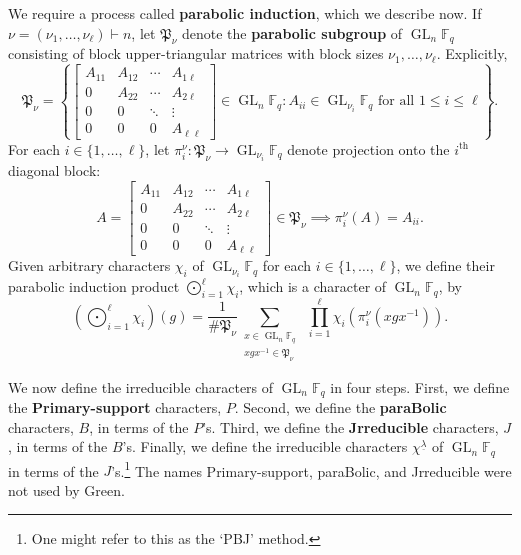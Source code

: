 \documentclass[Unicode,ALCO]{cedram}
\DeclareMathOperator{\GL}{GL}
\newcommand{\F}{\mathbb{F}}
\newcommand{\myemph}{\textbf}
\newcommand{\para}{\mathfrak{P}}
\newcommand{\ulambda}{{\underline{\lambda}}}
\begin{document}
We require a process called \myemph{parabolic induction}, which we describe now.
If $\nu = (\nu_1,\ldots,\nu_\ell) \vdash n$, let $\para_\nu$ denote the \myemph{parabolic subgroup} of $\GL_{n} \F_q$ consisting of block upper-triangular matrices with block sizes $\nu_1, \ldots, \nu_\ell$. Explicitly,
\begin{equation}
\label{para_def}
\para_\nu = \left \{
\begin{bmatrix}
A_{11} & A_{12} & \cdots & A_{1 \ell} \\
0 & A_{22} & \cdots & A_{2 \ell} \\
0 & 0 & \ddots & \vdots \\
0 & 0 & 0 & A_{\ell \ell}
\end{bmatrix} \in \GL_{n} \F_q :
A_{ii} \in \GL_{\nu_i} \F_q \text{ for all } 1 \leq i \leq \ell
\right \}.
\end{equation}
For each $i \in \{1,\ldots,\ell\}$, let $\pi_i^\nu : \para_{\nu} \to \GL_{\nu_i} \F_q$ denote projection
onto the $i^\text{th}$ diagonal block:
\begin{equation}
A = \begin{bmatrix}
A_{11} & A_{12} & \cdots & A_{1 \ell} \\
0 & A_{22} & \cdots & A_{2 \ell} \\
0 & 0 & \ddots & \vdots \\
0 & 0 & 0 & A_{\ell \ell}
\end{bmatrix}
\in \para_\nu
\implies
\pi_i^\nu (A) = A_{ii}.
\end{equation}
Given arbitrary characters $\chi_i$ of $\GL_{\nu_i} \F_q$ for each $i \in \{1,\ldots,\ell\}$,
we define their parabolic induction product $\bigodot_{i = 1}^\ell \chi_i$, which is a character of $\GL_{n} \F_q$, by
\begin{equation} \label{parabolic_induction} \left(\bigodot_{i = 1}^\ell \chi_i \right) (g) = \frac{1}{\# \para_\nu} \sum_{\substack{x \in \GL_{n} \F_q \\ xgx^{-1} \in \para_\nu}} \, \, \prod_{i = 1}^{\ell} \chi_i \left ( \pi^\nu_i ( xgx^{-1} ) \right ). \end{equation}

We now define the irreducible characters of $\GL_n \F_q$ in four steps. First, we define the \myemph{Primary-support} characters, $P$.
Second, we define the \myemph{paraBolic} characters, $B$, in terms of the $P$'s.
Third, we define the \myemph{Jrreducible} characters, $J$, in terms of the $B$'s.
Finally, we define the irreducible characters \(\chi^\ulambda\) of \(\GL_n \F_q\) in terms of the $J$'s.\footnote{One might refer to this as the `PBJ' method.}
The names Primary-support, paraBolic, and Jrreducible were not used by Green.
\end{document}

